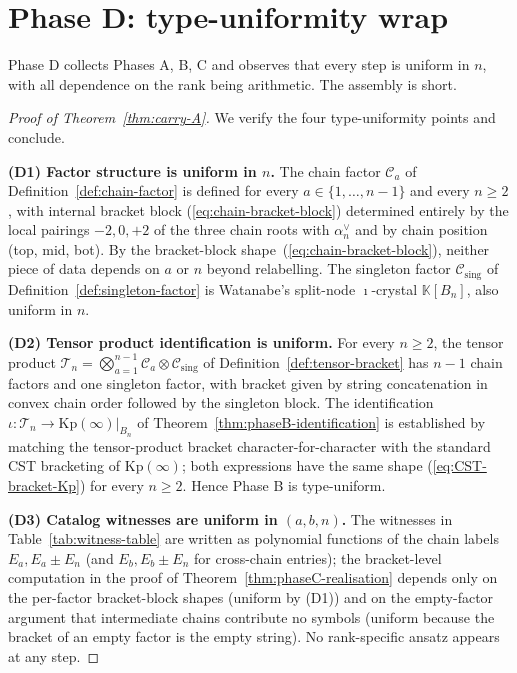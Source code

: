 \documentclass[11pt]{article}
\theoremstyle{definition}
\theoremstyle{remark}
\newcommand{\Kp}{\mathrm{Kp}}
\newcommand{\KK}{\mathbb{K}}
\newcommand{\Cmid}{\mathcal{C}}
\newcommand{\Csing}{\mathcal{C}_{\mathrm{sing}}}
\newcommand{\TT}{\mathcal{T}}
\begin{document}
\section{Phase D: type-uniformity wrap}\label{sec:phaseD}

Phase D collects Phases A, B, C and observes that every step is uniform in $n$,
with all dependence on the rank being arithmetic. The assembly is short.

\begin{proof}[Proof of Theorem~\ref{thm:carry-A}]
We verify the four type-uniformity points and conclude.

\smallskip
\noindent\textbf{(D1) Factor structure is uniform in $n$.} The chain factor
$\Cmid_a$ of Definition~\ref{def:chain-factor} is defined for every
$a \in \{1, \ldots, n-1\}$ and every $n \geq 2$, with internal bracket block
(\ref{eq:chain-bracket-block}) determined entirely by the local pairings $-2, 0, +2$
of the three chain roots with $\alpha_n^\vee$ and by chain position (top, mid, bot).
By the bracket-block shape~(\ref{eq:chain-bracket-block}), neither piece of data
depends on $a$ or $n$ beyond relabelling. The singleton factor $\Csing$ of Definition~\ref{def:singleton-factor}
is Watanabe's split-node $\imath$-crystal $\KK[B_n]$, also uniform in $n$.

\smallskip
\noindent\textbf{(D2) Tensor product identification is uniform.} For every
$n \geq 2$, the tensor product $\TT_n = \bigotimes_{a=1}^{n-1} \Cmid_a \otimes \Csing$
of Definition~\ref{def:tensor-bracket} has $n - 1$ chain factors and one
singleton factor, with bracket given by string concatenation in convex chain
order followed by the singleton block. The identification $\iota: \TT_n \to
\Kp(\infty)|_{B_n}$ of Theorem~\ref{thm:phaseB-identification} is established by
matching the tensor-product bracket character-for-character with the standard
CST bracketing of $\Kp(\infty)$; both expressions have the same shape
(\ref{eq:CST-bracket-Kp}) for every $n \geq 2$. Hence Phase B is type-uniform.

\smallskip
\noindent\textbf{(D3) Catalog witnesses are uniform in $(a, b, n)$.} The
witnesses in Table~\ref{tab:witness-table} are written as polynomial functions of
the chain labels $E_a, E_a \pm E_n$ (and $E_b, E_b \pm E_n$ for cross-chain
entries); the bracket-level computation in the proof of
Theorem~\ref{thm:phaseC-realisation} depends only on the per-factor bracket-block
shapes (uniform by (D1)) and on the empty-factor argument that intermediate
chains contribute no symbols (uniform because the bracket of an empty factor is
the empty string). No rank-specific ansatz appears at any step.


\end{proof}
\end{document}
